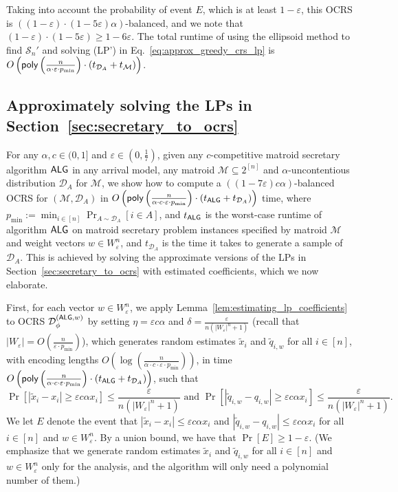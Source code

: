 \documentclass[11pt]{article}
\newcommand{\D}{\mathcal D}
\newcommand{\M}{{\mathcal M}}
\newcommand{\cS}{{\mathcal S}}
\newcommand{\alg}{\textnormal{\sffamily ALG}}
\newcommand{\eps}{\varepsilon}
\newcommand{\poly}{\textnormal{\sffamily poly}}
\begin{document}
Taking into account the probability of event $E$, which is at least $1-\eps$, this OCRS is $((1-\eps)\cdot(1-5\eps)\alpha)$-balanced, and we note that $(1-\eps)\cdot(1-5\eps)\ge1-6\eps$. The total runtime of using the ellipsoid method to find $\cS_n'$ and solving (LP') in Eq.~\eqref{eq:approx_greedy_crs_lp} is $O\left(\poly\left(\frac{n}{\alpha\cdot\eps\cdot p_{\min}}\right)\cdot(t_{\D_{A}}+t_{\M})\right)$.

\subsection{Approximately solving the LPs in Section~\ref{sec:secretary_to_ocrs}}
For any $\alpha,c\in(0,1]$ and $\eps\in\left(0,\frac{1}{7}\right)$, given any $c$-competitive matroid secretary algorithm $\alg$ in any arrival model, any matroid $\M\subseteq2^{[n]}$ and $\alpha$-uncontentious distribution $\D_A$ for $\M$, we show how to compute a $((1-7\eps)c\alpha)$-balanced OCRS for $(\M,\D_A)$ in $O\left(\poly\left(\frac{n}{\alpha\cdot c\cdot\eps\cdot p_{\min}}\right)\cdot(t_{\alg}+t_{\D_{A}})\right)$ time, where $p_{\min}:=\min_{i\in[n]}\Pr_{A\sim\D_A}[i\in A]$, and $t_{\alg}$ is the worst-case runtime of algorithm $\alg$ on matroid secretary problem instances specified by matroid $\M$ and weight vectors $w\in W_{\eps}^n$, and $t_{\D_A}$ is the time it takes to generate a sample of $\D_A$. This is achieved by solving the approximate versions of the LPs in Section~\ref{sec:secretary_to_ocrs} with estimated coefficients, which we now elaborate.

First, for each vector $w\in W_{\eps}^n$, we apply Lemma~\ref{lem:estimating_lp_coefficients} to OCRS $\D_{\phi}^{(\alg,w)}$ by setting $\eta=\eps c\alpha$ and $\delta=\frac{\eps}{n(|W_{\eps}|^n+1)}$ (recall that $|W_{\eps}|=O\left(\frac{n}{\eps\cdot p_{\min}}\right)$), which generates random estimates $\tilde{x}_i$ and $\tilde{q}_{i,w}$ for all $i\in[n]$, with encoding lengths $O\left(\log\left(\frac{n}{\alpha\cdot c\cdot\eps\cdot p_{\min}}\right)\right)$, in time $O\left(\poly\left(\frac{n}{\alpha\cdot c\cdot\eps\cdot p_{\min}}\right)\cdot(t_{\alg}+t_{\D_{A}})\right)$, such that
\[
    \Pr\left[|\tilde{x}_i-x_i|\ge\eps c\alpha x_i\right]\le\frac{\eps}{n(|W_{\eps}|^n+1)} \textrm{ and } \Pr\left[|\tilde{q}_{i,w}-q_{i,w}|\ge\eps c \alpha x_i\right]\le\frac{\eps}{n(|W_{\eps}|^n+1)}.
\]
We let $E$ denote the event that $|\tilde{x}_i-x_i|\le\eps c\alpha x_i$ and $|\tilde{q}_{i,w}-q_{i,w}|\le\eps c\alpha x_i$ for all $i\in[n]$ and $w\in W_{\eps}^n$. By a union bound, we have that $\Pr[E]\ge1-\eps$. (We emphasize that we generate random estimates $\tilde{x}_i$ and $\tilde{q}_{i,w}$ for all $i\in[n]$ and $w\in W_{\eps}^n$ only for the analysis, and the algorithm will only need a polynomial number of them.)
\end{document}
